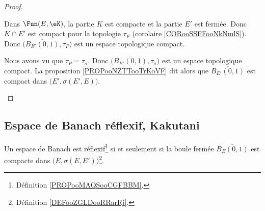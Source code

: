 \begin{proof}
\begin{subproof}
		\spitem[Conclusions]
		Dans \( \Fun(E,\eK)\), la partie \( K\) est compacte et la partie \( E'\) est fermée. Donc \( K\cap E'\) est compact pour la topologie \( \tau_F\) (corolaire \ref{CORooSSFFooNkNmlS}). Donc \( \big( \overline{B_{E'}(0,1)},\tau_P \big)\) est un espace topologique compact.

		Nous avons vu que \( \tau_P=\tau_{\sigma}\). Donc \( \big( \overline{B_{E'}(0,1)},\tau_{\sigma} \big)\) est un espace topologique compact. La proposition \ref{PROPooNZTTooTrKoVF} dit alors que \( \overline{B_{E'}(0,1)}\) est compact dans \( \big( E',\sigma(E',E) \big)\).
	\end{subproof}
\end{proof}


\subsection{Espace de Banach réflexif, Kakutani}

\begin{theorem}       \label{THOooTFIHooPQjVAr}
	Un espace de Banach est réflexif\footnote{Définition \ref{PROPooMAQSooCGFBBM}.} si et seulement si la boule fermée \( \overline{ B_E(0,1) }\) est compacte dans \( \big( E,\sigma(E,E') \big)\)\footnote{Définition \ref{DEFooZGLDooRRarRj}.}.
\end{theorem}

